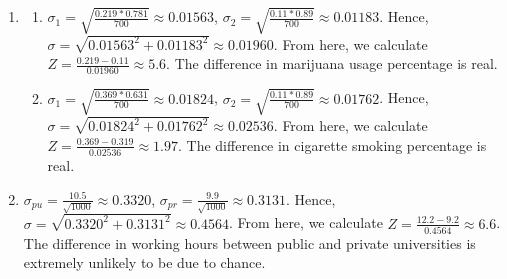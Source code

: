 \documentclass[12pt]{article}
\theoremstyle{plain}
\theoremstyle{definition}
\numberwithin{equation}{theorem}
\begin{document}
\begin{enumerate}
\addtocounter{enumi}{1}
\item
	\begin{enumerate}
	\item $\sigma_{1} = \sqrt{\frac{0.219*0.781}{700}} \approx 0.01563$, $\sigma_{2} = \sqrt{\frac{0.11*0.89}{700}} \approx 0.01183$. Hence, $\sigma = \sqrt{0.01563^{2}+0.01183^{2}} \approx 0.01960$. From here, we calculate $Z=\frac{0.219-0.11}{0.01960} \approx 5.6$. The difference in marijuana usage percentage is real.
	\item $\sigma_{1} = \sqrt{\frac{0.369*0.631}{700}} \approx 0.01824$, $\sigma_{2} = \sqrt{\frac{0.11*0.89}{700}} \approx 0.01762$. Hence, $\sigma = \sqrt{0.01824^{2}+0.01762^{2}} \approx 0.02536$. From here, we calculate $Z=\frac{0.369-0.319}{0.02536} \approx 1.97$. The difference in cigarette smoking percentage is real.
	\end{enumerate}
\item $\sigma_{pu} = \frac{10.5}{\sqrt{1000}} \approx 0.3320$, $\sigma_{pr} = \frac{9.9}{\sqrt{1000}} \approx 0.3131$. Hence, $\sigma = \sqrt{0.3320^{2}+0.3131^{2}} \approx 0.4564$. From here, we calculate $Z=\frac{12.2-9.2}{0.4564} \approx 6.6$. The difference in working hours between public and private universities is extremely unlikely to be due to chance.
\end{enumerate}
\bigskip
\end{document}
